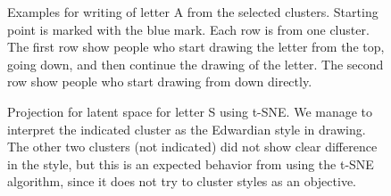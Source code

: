 \begin{figure}[!htbp]
      \caption{Examples for writing of letter A from the selected clusters. Starting point is marked with the blue mark. Each row is from one cluster. The first row show people who start drawing the letter from the top, going down, and then continue the drawing of the letter. The second row show people who start drawing from down directly.}
      \label{fig:examples_a}
  \end{figure}

  \begin{figure}[htbp!]
  \centering
  \caption{Projection for latent space for letter S using t-SNE. We manage to interpret the indicated cluster as the Edwardian style in drawing. The other two clusters (not indicated) did not show clear difference in the style, but this is an expected behavior from using the t-SNE algorithm, since it does not try to cluster styles as an objective.}
  \label{fig:s_bottleneck}
  \end{figure}


